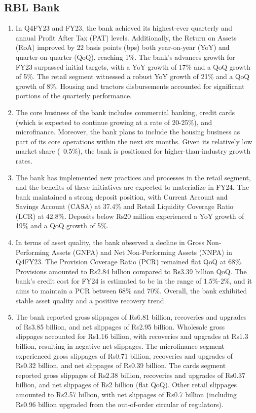 \subsection{RBL Bank}
\begin{enumerate}
    \item In Q4FY23 and FY23, the bank achieved its highest-ever quarterly and annual Profit After Tax (PAT) levels. Additionally, the Return on Assets (RoA) improved by 22 basis points (bps) both year-on-year (YoY) and quarter-on-quarter (QoQ), reaching 1\%. The bank's advances growth for FY23 surpassed initial targets, with a YoY growth of 17\% and a QoQ growth of 5\%. The retail segment witnessed a robust YoY growth of 21\% and a QoQ growth of 8\%. Housing and tractors disbursements accounted for significant portions of the quarterly performance.
    
    \item The core business of the bank includes commercial banking, credit cards (which is expected to continue growing at a rate of 20-25\%), and microfinance. Moreover, the bank plans to include the housing business as part of its core operations within the next six months. Given its relatively low market share (~0.5\%), the bank is positioned for higher-than-industry growth rates.
    
    \item The bank has implemented new practices and processes in the retail segment, and the benefits of these initiatives are expected to materialize in FY24. The bank maintained a strong deposit position, with Current Account and Savings Account (CASA) at 37.4\% and Retail Liquidity Coverage Ratio (LCR) at 42.8\%. Deposits below Rs20 million experienced a YoY growth of 19\% and a QoQ growth of 5\%.
    
    \item In terms of asset quality, the bank observed a decline in Gross Non-Performing Assets (GNPA) and Net Non-Performing Assets (NNPA) in Q4FY23. The Provision Coverage Ratio (PCR) remained flat QoQ at 68\%. Provisions amounted to Rs2.84 billion compared to Rs3.39 billion QoQ. The bank's credit cost for FY24 is estimated to be in the range of 1.5\%-2\%, and it aims to maintain a PCR between 68\% and 70\%. Overall, the bank exhibited stable asset quality and a positive recovery trend.
    
    \item The bank reported gross slippages of Rs6.81 billion, recoveries and upgrades of Rs3.85 billion, and net slippages of Rs2.95 billion. Wholesale gross slippages accounted for Rs1.16 billion, with recoveries and upgrades at Rs1.3 billion, resulting in negative net slippages. The microfinance segment experienced gross slippages of Rs0.71 billion, recoveries and upgrades of Rs0.32 billion, and net slippages of Rs0.39 billion. The cards segment reported gross slippages of Rs2.38 billion, recoveries and upgrades of Rs0.37 billion, and net slippages of Rs2 billion (flat QoQ). Other retail slippages amounted to Rs2.57 billion, with net slippages of Rs0.7 billion (including Rs0.96 billion upgraded from the out-of-order circular of regulators).
    

\end{enumerate}
